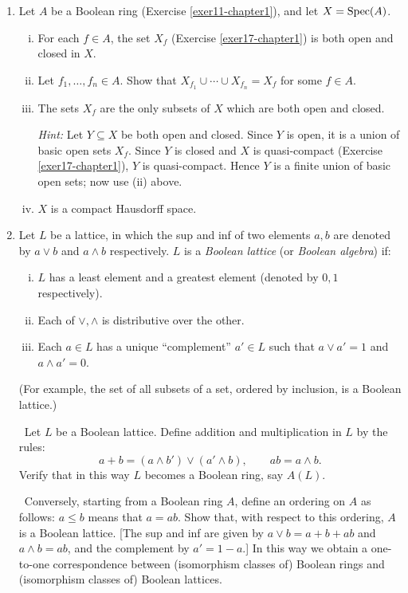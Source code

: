 \begin{enumerate}
    \item \label{exer23-chapter1}Let $A$ be a Boolean ring (Exercise \ref{exer11-chapter1}), and let $X = \operatorname{Spec}(A)$.
    \begin{enumerate}[i)]
        \item For each $f \in A$, the set $X_f$ (Exercise \ref{exer17-chapter1}) is both open and closed in $X$.
        \item Let $f_1, \ldots, f_n \in A$. Show that $X_{f_1} \cup \cdots \cup X_{f_n} = X_f$ for some $f \in A$.
        \item The sets $X_f$ are the only subsets of $X$ which are both open and closed.
        
        \textit{Hint:} Let $Y \subseteq X$ be both open and closed. Since $Y$ is open, it is a union of basic open sets $X_f$. Since $Y$ is closed and $X$ is quasi-compact (Exercise \ref{exer17-chapter1}), $Y$ is quasi-compact. Hence $Y$ is a finite union of basic open sets; now use (ii) above.
        \item $X$ is a compact Hausdorff space.
    \end{enumerate}

    \item \label{exer24-chapter1}Let $L$ be a lattice, in which the sup and inf of two elements $a, b$ are denoted by $a \vee b$ and $a \wedge b$ respectively. $L$ is a \emph{Boolean lattice} (or \emph{Boolean algebra}) if:
    \begin{enumerate}[i)]
        \item $L$ has a least element and a greatest element (denoted by $0, 1$ respectively).
        \item Each of $\vee, \wedge$ is distributive over the other.
        \item Each $a \in L$ has a unique ``complement'' $a' \in L$ such that $a \vee a' = 1$ and $a \wedge a' = 0$.
    \end{enumerate}
    (For example, the set of all subsets of a set, ordered by inclusion, is a Boolean lattice.)

    \quad\, Let $L$ be a Boolean lattice. Define addition and multiplication in $L$ by the rules:
    \[
        a + b = (a \wedge b') \vee (a' \wedge b), \qquad ab = a \wedge b.
    \]
    Verify that in this way $L$ becomes a Boolean ring, say $A(L)$.
    
    \quad\, Conversely, starting from a Boolean ring $A$, define an ordering on $A$ as follows: $a \leq b$ means that $a = ab$. Show that, with respect to this ordering, $A$ is a Boolean lattice. [The sup and inf are given by $a \vee b = a + b + ab$ and $a \wedge b = ab$, and the complement by $a' = 1 - a$.] In this way we obtain a one-to-one correspondence between (isomorphism classes of) Boolean rings and (isomorphism classes of) Boolean lattices.


\end{enumerate}
